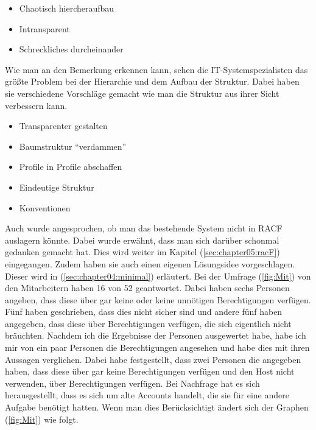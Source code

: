 \begin{itemize}
	\item Chaotisch hiercheraufbau
	\item Intransparent
	\item Schreckliches durcheinander
\end{itemize}

Wie man an den Bemerkung erkennen kann, sehen die IT-Systemspezialisten das größte Problem bei der Hierarchie und dem Aufbau der Struktur.
Dabei haben sie verschiedene Vorschläge gemacht wie man die Struktur aus ihrer Sicht verbessern kann.

\begin{itemize}
	\item Transparenter gestalten
	\item Baumstruktur "`verdammen"'
	\item Profile in Profile abschaffen
	\item Eindeutige Struktur
	\item Konventionen
\end{itemize}
Auch wurde angesprochen, ob man das bestehende System nicht in RACF auslagern könnte.
Dabei wurde erwähnt, dass man sich darüber schonmal gedanken gemacht hat.
Dies wird weiter im Kapitel (\ref{sec:chapter05:racF}) eingegangen.
Zudem haben sie auch einen eigenen Lösungsidee vorgeschlagen.
Dieser wird in (\ref{sec:chapter04:minimal}) erläutert.
\newline
\newline
Bei der Umfrage (\ref{fig:Mit}) von den Mitarbeitern haben 16 von 52 geantwortet.
Dabei haben sechs Personen angeben, dass diese über gar keine oder keine unnötigen Berechtigungen verfügen.
Fünf haben geschrieben, dass dies nicht sicher sind und andere fünf haben angegeben, dass diese über Berechtigungen verfügen, die sich eigentlich nicht bräuchten.
Nachdem ich die Ergebnisse der Personen ausgewertet habe, habe ich mir von ein paar Personen die Berechtigungen angesehen und habe dies mit ihren Aussagen verglichen.
Dabei habe festgestellt, dass zwei Personen die angegeben haben, dass diese über gar keine Berechtigungen verfügen und den Host nicht verwenden, über Berechtigungen verfügen.
Bei Nachfrage hat es sich herausgestellt, dass es sich um alte Accounts handelt, die sie für eine andere Aufgabe benötigt hatten.
Wenn man dies Berücksichtigt ändert sich der Graphen (\ref{fig:Mit}) wie folgt.
